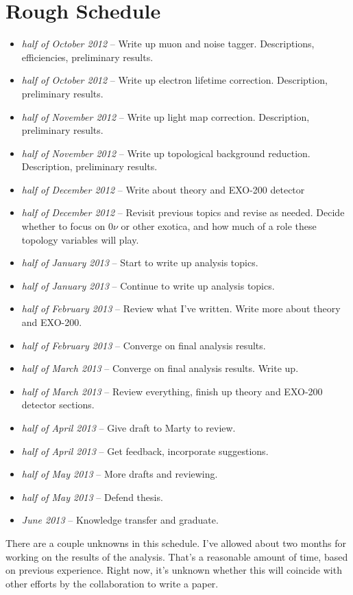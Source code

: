 \documentclass[12pt,letterpaper,onecolumn]{article}
\begin{document}
\section{Rough Schedule}
\begin{itemize}
\item \textit{ half of October 2012} -- Write up muon and noise tagger. Descriptions, efficiencies, preliminary results.
\item \textit{ half of October 2012} -- Write up electron lifetime correction. Description, preliminary results.
\item \textit{ half of November 2012} -- Write up light map correction. Description, preliminary results.
\item \textit{ half of November 2012} -- Write up topological background reduction. Description, preliminary results.
\item \textit{ half of December 2012} -- Write about theory and EXO-200 detector
\item \textit{ half of December 2012} -- Revisit previous topics and revise as needed. Decide whether to focus on \(0\nu\) or other exotica, and how much of a role these topology variables will play. 
\item \textit{ half of January 2013} -- Start to write up analysis topics.
\item \textit{ half of January 2013} -- Continue to write up analysis topics.
\item \textit{ half of February 2013} -- Review what I've written. Write more about theory and EXO-200.
\item \textit{ half of February 2013} -- Converge on final analysis results.
\item \textit{ half of March 2013} -- Converge on final analysis results. Write up.
\item \textit{ half of March 2013} -- Review everything, finish up theory and EXO-200 detector sections.
\item \textit{ half of April 2013} -- Give draft to Marty to review. 
\item \textit{ half of April 2013} -- Get feedback, incorporate suggestions.
\item \textit{ half of May 2013} -- More drafts and reviewing. 
\item \textit{ half of May 2013} -- Defend thesis.
\item \textit{June 2013} -- Knowledge transfer and graduate.
\end{itemize}

There are a couple unknowns in this schedule. I've allowed about two months for working on the results of the analysis. That's a reasonable amount of time, based on previous experience. Right now, it's unknown whether this will coincide with other efforts by the collaboration to write a paper.
\end{document}

